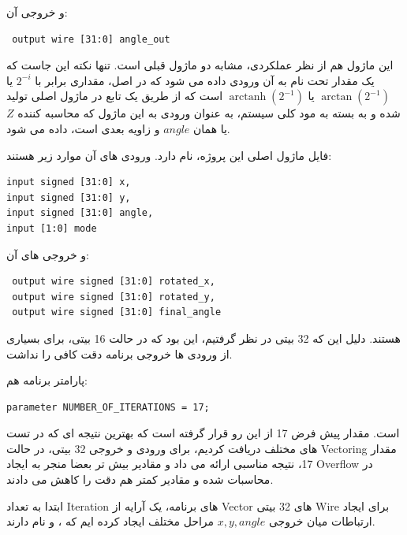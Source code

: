 \documentclass[12pt,titlepage,a4page , tikz , multi,table , svgnames,xcdraw]{article}
\DeclareMathOperator\arctanh{arctanh}
\begin{document}
و خروجی آن:

\begin{latin}
\begin{verbatim}
 output wire [31:0] angle_out
\end{verbatim}
\end{latin}

این ماژول هم از نظر عملکردی، مشابه دو ماژول قبلی است. تنها نکته این جاست که یک مقدار تحت نام  به آن ورودی داده می شود که در اصل، مقداری برابر با $2^{-i}$ یا $\arctan (2^{-1})$ یا
$\arctanh (2^{-1})$
است که از طریق یک تابع در ماژول اصلی تولید شده و به بسته به مود کلی سیستم، به عنوان ورودی به این ماژول که محاسبه کننده $Z$ یا همان $angle$ و زاویه بعدی است، داده می شود.

\hrulefill

فایل ماژول اصلی این پروژه،  نام دارد. ورودی های آن موارد زیر هستند:

\begin{latin}
\begin{verbatim}
input signed [31:0] x,
input signed [31:0] y,
input signed [31:0] angle,
input [1:0] mode
\end{verbatim}
\end{latin}

و خروجی های آن:

\begin{latin}
\begin{verbatim}
 output wire signed [31:0] rotated_x,
 output wire signed [31:0] rotated_y,
 output wire signed [31:0] final_angle
\end{verbatim}
\end{latin}

هستند. دلیل این که 32 بیتی در نظر گرفتیم، این بود که در حالت 16 بیتی، برای بسیاری از ورودی ها خروجی برنامه دقت کافی را نداشت.

پارامتر برنامه هم:

\begin{latin}
\begin{verbatim}
parameter NUMBER_OF_ITERATIONS = 17;
\end{verbatim}
\end{latin}

است. مقدار پیش فرض 17 از این رو قرار گرفته است که بهترین نتیجه ای که در تست های مختلف دریافت کردیم، برای ورودی و خروجی 32 بیتی، در حالت Vectoring مقدار 17، نتیجه مناسبی ارائه می داد و مقادیر بیش تر بعضا منجر به ایجاد Overflow در محاسبات شده و مقادیر کمتر هم دقت را کاهش می دادند.


ابتدا به تعداد Iteration های برنامه، یک آرایه از Vector های 32 بیتی Wire برای ایجاد ارتباطات میان خروجی $x,y,angle$ مراحل مختلف ایجاد کرده ایم که ،  و  نام دارند.
\end{document}
